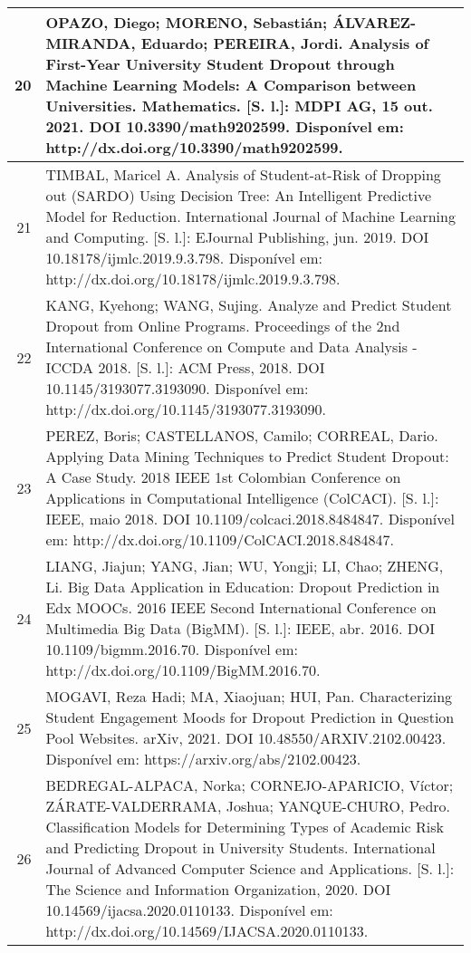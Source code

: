 \begin{apendicesenv}
\begin{longtable}[c]{|r|l|}
20 &
  \multicolumn{1}{p{14.5cm}|}{OPAZO, Diego; MORENO, Sebastián; ÁLVAREZ-MIRANDA, Eduardo; PEREIRA, Jordi. Analysis of First-Year University Student Dropout through Machine Learning Models: A Comparison between Universities. Mathematics. {[}S. l.{]}: MDPI AG, 15 out. 2021. DOI 10.3390/math9202599. Disponível em: http://dx.doi.org/10.3390/math9202599.} \\ \hline
21 &
  \multicolumn{1}{p{14.5cm}|}{TIMBAL, Maricel A. Analysis of Student-at-Risk of Dropping out (SARDO) Using Decision Tree: An Intelligent Predictive Model for Reduction. International Journal of Machine Learning and Computing. {[}S. l.{]}: EJournal Publishing, jun. 2019. DOI 10.18178/ijmlc.2019.9.3.798. Disponível em: http://dx.doi.org/10.18178/ijmlc.2019.9.3.798.} \\ \hline
22 &
  \multicolumn{1}{p{14.5cm}|}{KANG, Kyehong; WANG, Sujing. Analyze and Predict Student Dropout from Online Programs. Proceedings of the 2nd International Conference on Compute and Data Analysis - ICCDA 2018. {[}S. l.{]}: ACM Press, 2018. DOI 10.1145/3193077.3193090. Disponível em: http://dx.doi.org/10.1145/3193077.3193090.} \\ \hline
23 &
  \multicolumn{1}{p{14.5cm}|}{PEREZ, Boris; CASTELLANOS, Camilo; CORREAL, Dario. Applying Data Mining Techniques to Predict Student Dropout: A Case Study. 2018 IEEE 1st Colombian Conference on Applications in Computational Intelligence (ColCACI). {[}S. l.{]}: IEEE, maio 2018. DOI 10.1109/colcaci.2018.8484847. Disponível em: http://dx.doi.org/10.1109/ColCACI.2018.8484847.} \\ \hline
24 &
  \multicolumn{1}{p{14.5cm}|}{LIANG, Jiajun; YANG, Jian; WU, Yongji; LI, Chao; ZHENG, Li. Big Data Application in Education: Dropout Prediction in Edx MOOCs. 2016 IEEE Second International Conference on Multimedia Big Data (BigMM). {[}S. l.{]}: IEEE, abr. 2016. DOI 10.1109/bigmm.2016.70. Disponível em: http://dx.doi.org/10.1109/BigMM.2016.70.} \\ \hline
25 &
  \multicolumn{1}{p{14.5cm}|}{MOGAVI, Reza Hadi; MA, Xiaojuan; HUI, Pan. Characterizing Student Engagement Moods for Dropout Prediction in Question Pool Websites. arXiv, 2021. DOI 10.48550/ARXIV.2102.00423. Disponível em: https://arxiv.org/abs/2102.00423.} \\ \hline
26 &
  \multicolumn{1}{p{14.5cm}|}{BEDREGAL-ALPACA, Norka; CORNEJO-APARICIO, Víctor; ZÁRATE-VALDERRAMA, Joshua; YANQUE-CHURO, Pedro. Classification Models for Determining Types of Academic Risk and Predicting Dropout in University Students. International Journal of Advanced Computer Science and Applications. {[}S. l.{]}: The Science and Information Organization, 2020. DOI 10.14569/ijacsa.2020.0110133. Disponível em: http://dx.doi.org/10.14569/IJACSA.2020.0110133.} \\ \hline

\end{longtable}
\end{apendicesenv}
